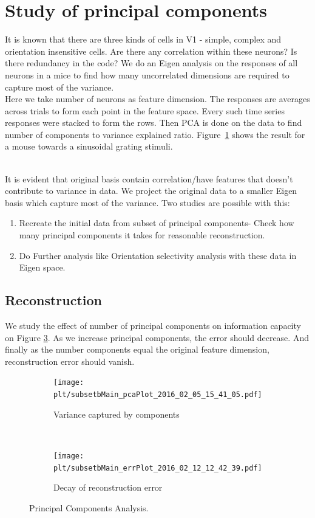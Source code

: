 \documentclass[11pt,paper=a4,answers]{exam}
\newcommand{\plt}{../../plots}
\begin{document}
\section{Study of principal components} %
\label{sec:study_of_correlation}
It is known that there are three kinds of cells in V1 - simple, complex and orientation insensitive cells. Are there any correlation within these neurons? Is there redundancy in the code? We do an Eigen analysis on the responses of all neurons in a mice to find how many uncorrelated dimensions are required to capture most of the variance.\\
Here we take number of neurons as feature dimension. The responses are averages across trials to form each point in the feature space. Every such time series responses were stacked to form the rows. Then PCA is done on the data to find number of components to variance explained ratio. Figure~\ref{img:pca} shows the result for a mouse towards a sinusoidal grating stimuli.
\begin{figure}
    \centering

\end{figure}\\
It is evident that original basis contain correlation/have features that doesn't contribute to variance in data. We project the original data to a smaller Eigen basis which capture most of the variance. Two studies are possible with this:
\begin{enumerate}
    \item Recreate the initial data from subset of principal components- Check how many principal components it takes for reasonable reconstruction.
    \item Do Further analysis like Orientation selectivity analysis with these data in Eigen space.
\end{enumerate}
\subsection{Reconstruction} %
\label{sub:reconstruction}
We study the effect of number of principal components on information capacity on Figure \ref{img:reconstruction}. As we increase principal components, the error should decrease. And finally as the number components equal the original feature dimension, reconstruction error should vanish.
\begin{figure}
    \centering
    \begin{subfigure}[b]{.48\textwidth}
        \centering
        \texttt{[image: \\plt/subsetbMain\_pcaPlot\_2016\_02\_05\_15\_41\_05.pdf]}
        \caption{Variance captured by components}
        \label{img:pca}
    \end{subfigure}
    ~
    \begin{subfigure}[b]{.48\textwidth}
        \centering
        \texttt{[image: \\plt/subsetbMain\_errPlot\_2016\_02\_12\_12\_42\_39.pdf]}
        \caption{Decay of reconstruction error}
        \label{img:reconstruction}
    \end{subfigure}
    \caption{Principal Components Analysis.}
\end{figure}
\end{document}
